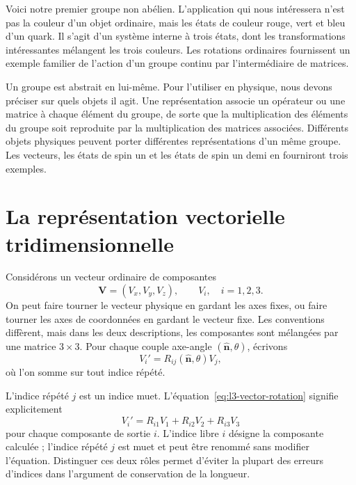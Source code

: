 Voici notre premier groupe non abélien. L’application qui nous intéressera n’est pas la couleur d’un objet ordinaire, mais les états de couleur rouge, vert et bleu d’un quark. Il s’agit d’un système interne à trois états, dont les transformations intéressantes mélangent les trois couleurs. Les rotations ordinaires fournissent un exemple familier de l’action d’un groupe continu par l’intermédiaire de matrices.

Un groupe est abstrait en lui-même. Pour l’utiliser en physique, nous devons préciser sur quels objets il agit. Une {représentation} associe un opérateur ou une matrice à chaque élément du groupe, de sorte que la multiplication des éléments du groupe soit reproduite par la multiplication des matrices associées. Différents objets physiques peuvent porter différentes représentations d’un même groupe. Les vecteurs, les états de spin un et les états de spin un demi en fourniront trois exemples.

\section{La représentation vectorielle tridimensionnelle}

Considérons un vecteur ordinaire de composantes
\begin{equation}
\boldsymbol V=(V_x,V_y,V_z),\qquad V_i,\quad i=1,2,3.
\end{equation}
On peut faire tourner le vecteur physique en gardant les axes fixes, ou faire tourner les axes de coordonnées en gardant le vecteur fixe. Les conventions diffèrent, mais dans les deux descriptions, les composantes sont mélangées par une matrice \(3\times3\). Pour chaque couple axe-angle \((\hat{\boldsymbol n},\theta)\), écrivons
\begin{equation}
V_i'=R_{ij}(\hat{\boldsymbol n},\theta)V_j,
\label{eq:l3-vector-rotation}
\end{equation}
où l’on somme sur tout indice répété.

L’indice répété \(j\) est un indice muet. L’équation~\eqref{eq:l3-vector-rotation} signifie explicitement
\begin{equation}
V_i'=R_{i1}V_1+R_{i2}V_2+R_{i3}V_3
\end{equation}
pour chaque composante de sortie \(i\). L’indice libre \(i\) désigne la composante calculée ; l’indice répété \(j\) est muet et peut être renommé sans modifier l’équation. Distinguer ces deux rôles permet d’éviter la plupart des erreurs d’indices dans l’argument de conservation de la longueur.

